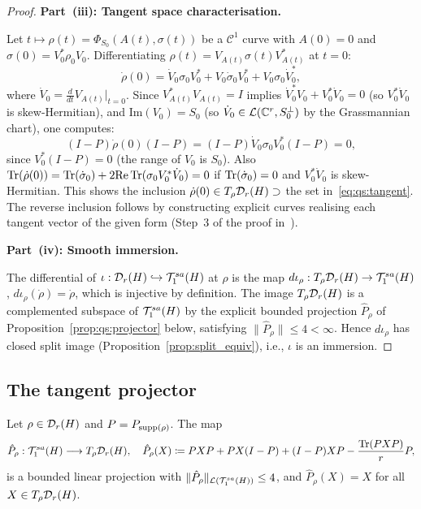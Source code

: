 \begin{proof}
\medskip
\noindent\textbf{Part~(iii): Tangent space characterisation.}

Let $t \mapsto \rho(t) = \Phi_{S_0}(A(t), \sigma(t))$ be a
$\mathcal{C}^1$ curve with $A(0) = 0$ and $\sigma(0) = V_0^* \rho_0
V_0$. Differentiating $\rho(t) = V_{A(t)} \sigma(t) V_{A(t)}^*$ at
$t=0$:
\begin{equation*}
    \dot\rho(0) = \dot V_0 \sigma_0 V_0^* + V_0 \dot\sigma_0 V_0^*
    + V_0 \sigma_0 \dot V_0^*,
\end{equation*}
where $\dot V_0 = \frac{d}{dt}V_{A(t)}|_{t=0}$. Since $V_{A(t)}^*
V_{A(t)} = I$ implies $\dot V_0^* V_0 + V_0^* \dot V_0 = 0$ (so
$V_0^* \dot V_0$ is skew-Hermitian), and $\mathrm{Im}(V_0) = S_0$
(so $\dot V_0 \in \mathcal{L}(\mathbb{C}^r, S_0^\perp)$ by the Grassmannian chart),
one computes:
\begin{equation*}
    (I - P)\dot\rho(0)(I - P)
    = (I-P)\dot V_0 \sigma_0 V_0^*(I-P) = 0,
\end{equation*}
since $V_0^*(I-P) = 0$ (the range of $V_0$ is $S_0$). Also
$\mathrm{Tr}(\dot\rho(0)) = \mathrm{Tr}(\dot\sigma_0) + 2\mathrm{Re}\,\mathrm{Tr}(\sigma_0
V_0^* \dot V_0) = 0$ if $\mathrm{Tr}(\dot\sigma_0) = 0$ and $V_0^*\dot V_0$
is skew-Hermitian. This shows the inclusion
$\dot\rho(0) \in T_\rho \mathcal{D}_{r}(H) \supset$ the set in~\eqref{eq:qs:tangent}.
The reverse inclusion follows by constructing explicit curves realising
each tangent vector of the given form (Step~3 of the proof
in~\cite{AcevedoFalco2026}).

\medskip
\noindent\textbf{Part~(iv): Smooth immersion.}

The differential of $\iota: \mathcal{D}_{r}(H) \hookrightarrow \mathcal{T}_{1}^{sa}(H)$
at $\rho$ is the map $d\iota_\rho: T_\rho \mathcal{D}_{r}(H) \to \mathcal{T}_{1}^{sa}(H)$,
$d\iota_\rho(\dot\rho) = \dot\rho$, which is injective by definition.
The image $T_\rho \mathcal{D}_{r}(H)$ is a complemented subspace of
$\mathcal{T}_{1}^{sa}(H)$ by the explicit bounded projection $\hat P_\rho$ of
Proposition~\ref{prop:qs:projector} below, satisfying
$\|\hat P_\rho\| \leq 4 < \infty$. Hence $d\iota_\rho$ has closed
split image (Proposition~\ref{prop:split_equiv}), i.e., $\iota$ is
an immersion.
\end{proof}

\subsection*{The tangent projector}

\begin{proposition}
\label{prop:qs:projector}
Let $\rho \in \mathcal{D}_{r}(H)$ and $P = P_{\mathrm{supp}(\rho)}$. The map
\begin{equation}
\label{eq:qs:projector}
    \hat{P}_\rho: \mathcal{T}_{1}^{sa}(H) \longrightarrow T_\rho \mathcal{D}_{r}(H),
    \quad
    \hat{P}_\rho(X) \coloneqq PXP + PX(I-P) + (I-P)XP
    - \frac{\mathrm{Tr}(PXP)}{r} P,
\end{equation}
is a bounded linear projection with $\|\hat{P}_\rho\|_{\mathcal{L}(\mathcal{T}_{1}^{sa}(H))}
\leq 4$, and $\hat{P}_\rho(X) = X$ for all $X \in T_\rho \mathcal{D}_{r}(H)$.
\end{proposition}

